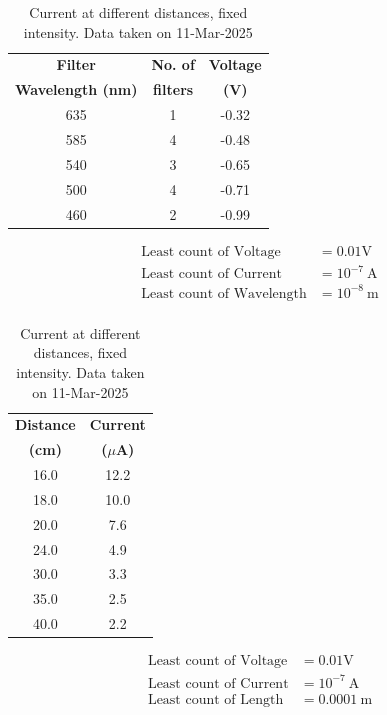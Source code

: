 \documentclass[%
 sor,
 jor,
 amsmath,amssymb,
 reprint,%
]{revtex4-2}
\begin{document}
\begin{table}[ht]
\centering
    \begin{minipage}[b]{0.48\hsize}\centering
\begin{tabular}{|c|c|c|}
\hline
\textbf{Filter}& \textbf{No. of } & \textbf{Voltage} \\
\textbf{Wavelength (nm)} & \textbf{filters}& \textbf{(V)}		\\
\hline
635 & 1 &	-0.32		\\
585 & 4 &	 -0.48        \\  
540 & 3 &	  -0.65       \\
500 & 4 &	   -0.71      \\
460 & 2 &	    -0.99     \\

\hline
\end{tabular}
\caption{Stopping voltage at different filters, with source at $l=25.0 \si{\centi\meter}$. Data taken on 11-Mar-2025}
\label{tab:table1}
\[
\boxed{
\begin{aligned}
         \text{Least count of Voltage}  &= 0.01\si{\volt} \\
	 \text{Least count of Current}  &= 10^{-7}~\si{\ampere} \\
	 \text{Least count of Wavelength}  &= 10^{-8}~\si{\meter} \\
\end{aligned}
}
\]


\end{minipage}
\hfill\vline\hfill
    \begin{minipage}[b]{0.48\hsize}\centering
\begin{tabular}{|c|c|}
\hline
\textbf{Distance } & \textbf{Current} \\
\textbf{(cm)} & \textbf{($\mu$A)} \\
\hline
16.0 	 &12.2 		\\
18.0 	 &10.0          \\  
20.0 	 & 7.6          \\
24.0 	 & 4.9          \\
30.0 	 & 3.3          \\
35.0 	 & 2.5  	\\
40.0 	 & 2.2  	\\
\hline
\end{tabular}
\caption{Current at different distances, fixed intensity. Data taken on 11-Mar-2025 }
\label{tab:table2}
\[ \boxed{
 \begin{aligned}
         \text{Least count of Voltage}  &= 0.01\si{\volt} \\
	 \text{Least count of Current}  &= 10^{-7}~\si{\ampere} \\
         \text{Least count of Length}  &= 0.0001~\si{\meter} \\
 \end{aligned}
}
\]

   \end{minipage}
\end{table}
\end{document}

